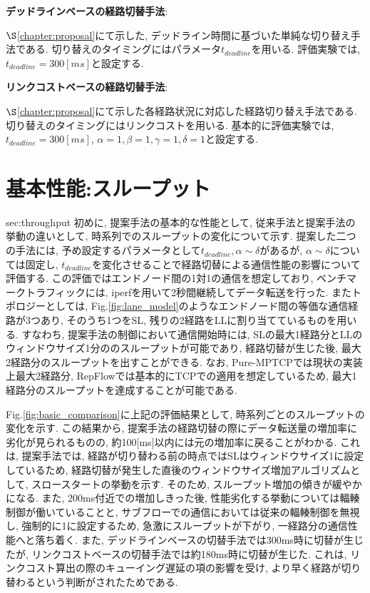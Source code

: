 {\bf デッドラインベースの経路切替手法}: 

$\S$\ref{chapter:proposal}にて示した,
デッドライン時間に基づいた単純な切り替え手法である.
切り替えのタイミングにはパラメータ$t_{deadline}$を用いる. 
評価実験では, $t_{deadline}=300[ms]$と設定する.

{\bf リンクコストベースの経路切替手法}: 

$\S$\ref{chapter:proposal}にて示した各経路状況に対応した経路切り替え手法である. 
切り替えのタイミングにはリンクコストを用いる. 
基本的に評価実験では, $t_{deadline}=300[ms]$, $\alpha=1, \beta=1, \gamma=1,
\delta=1$と設定する.

\section{基本性能:スループット}
\large{sec:throughput}
初めに, 提案手法の基本的な性能として, 従来手法と提案手法の挙動の違いとして, 時系列でのスループットの変化について示す.  
提案した二つの手法には, 予め設定するパラメータとして$t_{deadline}, \alpha \sim \delta$があるが, $\alpha
\sim \delta$については固定し, $t_{deadline}$を変化させることで経路切替による通信性能の影響について評価する. 
この評価ではエンドノード間の1対1の通信を想定しており, ベンチマークトラフィックには,
iperfを用いて2秒間継続してデータ転送を行った. 
またトポロジーとしては, Fig.\ref{fig:lane_model}のようなエンドノード間の等価な通信経路が3つあり, そのうち1つをSL,
残りの2経路をLLに割り当てているものを用いる.
すなわち, 提案手法の制御において通信開始時には, SLの最大1経路分とLLのウィンドウサイズ1分ののスループットが可能であり, 経路切替が生じた後,
最大2経路分のスループットを出すことができる.
なお, Pure-MPTCPでは現状の実装上最大2経路分, RepFlowでは基本的にTCPでの適用を想定しているため,
最大1経路分のスループットを達成することが可能である. 

Fig.\ref{fig:basic_comparison}に上記の評価結果として, 時系列ごとのスループットの変化を示す. 
この結果から, 提案手法の経路切替の際にデータ転送量の増加率に劣化が見られるものの, 約100[ms]以内には元の増加率に戻ることがわかる. 
これは, 提案手法では, 経路が切り替わる前の時点ではSLはウィンドウサイズ1に設定しているため,
経路切替が発生した直後のウィンドウサイズ増加アルゴリズムとして, スロースタートの挙動を示す. 
そのため, スループット増加の傾きが緩やかになる. 
また, 200ms付近での増加しきった後, 性能劣化する挙動については輻輳制御が働いていることと,
サブフローでの通信においては従来の輻輳制御を無視し, 強制的に1に設定するため, 急激にスループットが下がり, 一経路分の通信性能へと落ち着く. 
また, デッドラインベースの切替手法では300ms時に切替が生じたが, リンクコストベースの切替手法では約180ms時に切替が生じた. 
これは, リンクコスト算出の際のキューイング遅延の項の影響を受け, より早く経路が切り替わるという判断がされたためである. 


